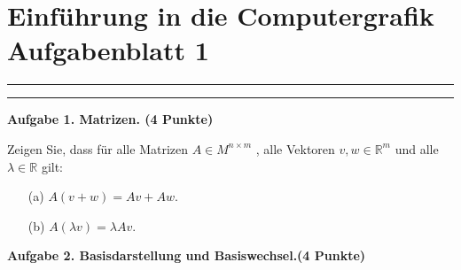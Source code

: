 \documentclass[a4paper,12pt]{scrartcl}
\begin{document}




\section*{\large Einf\"uhrung in die Computergrafik \\\vspace*{5mm}
                  \normalsize  Aufgabenblatt 1 }
\hrule
\hrule
\vspace{4mm}



{\bf Aufgabe 1. Matrizen. \hfill (4 Punkte)}

Zeigen Sie, dass f\"ur alle Matrizen $A  \in M^{n \times m}$ ,  alle Vektoren $v,w \in \mathbb{R}^m$ und alle $\lambda \in \mathbb{R}$ gilt:
\begin{itemize}
\item[(a)]   $A(v +w) =  Av +Aw $.
\item[(b)] $A (\lambda v) = \lambda A v$. 
\end{itemize}

 
\vspace*{8mm}


{\bf Aufgabe 2.  Basisdarstellung und Basiswechsel.\hfill (4 Punkte)}
\end{document}
